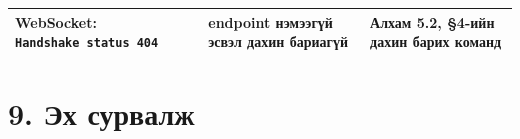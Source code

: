 \begin{longtable}[]{@{}lll@{}}
\begin{minipage}[t]{0.30\columnwidth}\raggedright
WebSocket: \texttt{Handshake\ status\ 404}\strut
\end{minipage} & \begin{minipage}[t]{0.30\columnwidth}\raggedright
endpoint нэмээгүй эсвэл дахин бариагүй\strut
\end{minipage} & \begin{minipage}[t]{0.30\columnwidth}\raggedright
Алхам 5.2, §4-ийн дахин барих команд\strut
\end{minipage}\tabularnewline
\bottomrule
\end{longtable}\endgroup

\hypertarget{ux44dux445-ux441ux443ux440ux432ux430ux43bux436}{%
\section{9. Эх сурвалж}\label{ux44dux445-ux441ux443ux440ux432ux430ux43bux436}}

